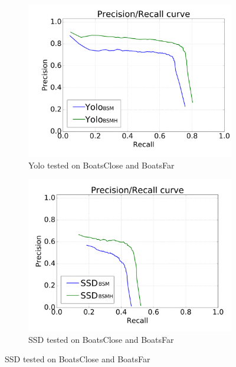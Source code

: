 \begin{figure}[h!]
\begin{subfigure}{.5\textwidth}
  \centering
  \includegraphics[width=0.8\linewidth]{results/case_buildings/prec_recall/yolo/bcbf-eps.png}
  \caption{Yolo tested on BoatsClose and BoatsFar}
  \label{fig:sfig1}
\end{subfigure}%
\begin{subfigure}{.5\textwidth}
  \centering
  \includegraphics[width=.8\linewidth]{results/case_buildings/prec_recall/ssd/bcbf-eps.png}
  \caption{SSD tested on BoatsClose and BoatsFar}
  \label{fig:sfig2}
\end{subfigure}


\end{figure}
